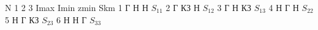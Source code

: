 N	1	2	3	Imax	Imin	zmin	Skm
1	Г	Н	Н	$S_{11}$
2	Г	КЗ	Н	$S_{12}$
3	Г	Н	КЗ	$S_{13}$
4	Н	Г	Н	$S_{22}$
5	Н	Г	КЗ	$S_{23}$
6	Н	Н	Г	$S_{33}$